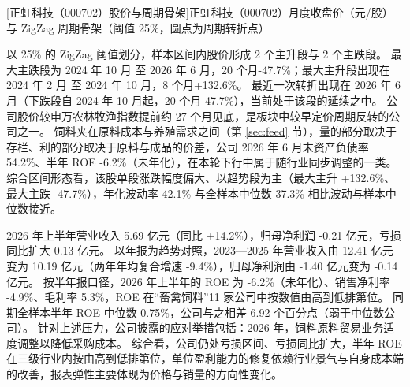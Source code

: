 \begin{center}
\begin{minipage}{\textwidth}\centering
{}

[正虹科技（000702）股价与周期骨架]{正虹科技（000702）月度收盘价（元/股）与 ZigZag 周期骨架（阈值 25\%，圆点为周期转折点）}
\end{minipage}
\end{center}

 以 25\% 的 ZigZag 阈值划分，样本区间内股价形成 2 个主升段与 2 个主跌段。 最大主跌段为 2024 年 10 月 至 2026 年 6 月，20 个月-47.7\%；最大主升段出现在 2024 年 2 月 至 2024 年 10 月，8 个月+132.6\%。 最近一次转折出现在 2026 年 6 月（下跌段自 2024 年 10 月起，20 个月-47.7\%），当前处于该段的延续之中。 公司股价较申万农林牧渔指数提前约 27 个月见底，是板块中较早定价周期反转的公司之一。 饲料夹在原料成本与养殖需求之间（第 \ref{sec:feed} 节），量的部分取决于存栏、利的部分取决于原料与成品的价差，公司 2026 年 6 月末资产负债率 54.2\%、半年 ROE -6.2\%（未年化），在本轮下行中属于随行业同步调整的一类。 综合区间形态看，该股单段涨跌幅度偏大、以趋势段为主（最大主升 +132.6\%、最大主跌 -47.7\%），年化波动率 42.1\% 与全样本中位数 37.3\% 相比波动与样本中位数接近。

 2026 年上半年营业收入 5.69 亿元（同比 +14.2\%），归母净利润 -0.21 亿元，亏损同比扩大 0.13 亿元。 以年报为趋势对照，2023---2025 年营业收入由 12.41 亿元变为 10.19 亿元（两年年均复合增速 -9.4\%），归母净利润由 -1.40 亿元变为 -0.14 亿元。 按半年报口径，2026 年上半年的 ROE 为 -6.2\%（未年化）、销售净利率 -4.9\%、毛利率 5.3\%，ROE 在“畜禽饲料”11 家公司中按数值由高到低排第位。 同期全样本半年 ROE 中位数 0.75\%，公司与之相差 6.92 个百分点（弱于中位数公司）。 针对上述压力，公司披露的应对举措包括：2026 年，饲料原料贸易业务适度调整以降低采购成本。 综合看，公司仍处亏损区间、亏损同比扩大，半年 ROE 在三级行业内按由高到低排第位，单位盈利能力的修复依赖行业景气与自身成本端的改善，报表弹性主要体现为价格与销量的方向性变化。


